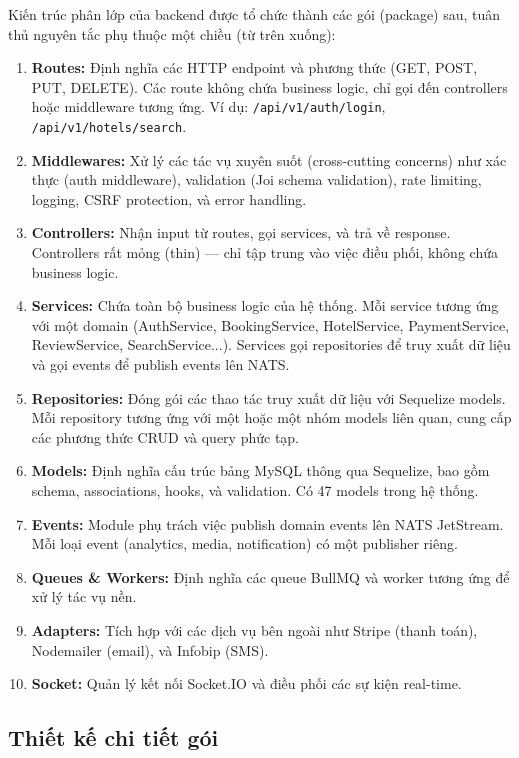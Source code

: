 \documentclass[13pt,a4paper,twoside]{report}
\begin{document}
Kiến trúc phân lớp của backend được tổ chức thành các gói (package) sau, tuân thủ nguyên tắc phụ thuộc một chiều (từ trên xuống):

\begin{enumerate}
  \item \textbf{Routes:} Định nghĩa các HTTP endpoint và phương thức (GET, POST, PUT, DELETE). Các route không chứa business logic, chỉ gọi đến controllers hoặc middleware tương ứng. Ví dụ: \texttt{/api/v1/auth/login}, \texttt{/api/v1/hotels/search}.
  \item \textbf{Middlewares:} Xử lý các tác vụ xuyên suốt (cross-cutting concerns) như xác thực (auth middleware), validation (Joi schema validation), rate limiting, logging, CSRF protection, và error handling.
  \item \textbf{Controllers:} Nhận input từ routes, gọi services, và trả về response. Controllers rất mỏng (thin) --- chỉ tập trung vào việc điều phối, không chứa business logic.
  \item \textbf{Services:} Chứa toàn bộ business logic của hệ thống. Mỗi service tương ứng với một domain (AuthService, BookingService, HotelService, PaymentService, ReviewService, SearchService...). Services gọi repositories để truy xuất dữ liệu và gọi events để publish events lên NATS.
  \item \textbf{Repositories:} Đóng gói các thao tác truy xuất dữ liệu với Sequelize models. Mỗi repository tương ứng với một hoặc một nhóm models liên quan, cung cấp các phương thức CRUD và query phức tạp.
  \item \textbf{Models:} Định nghĩa cấu trúc bảng MySQL thông qua Sequelize, bao gồm schema, associations, hooks, và validation. Có 47 models trong hệ thống.
  \item \textbf{Events:} Module phụ trách việc publish domain events lên NATS JetStream. Mỗi loại event (analytics, media, notification) có một publisher riêng.
  \item \textbf{Queues \& Workers:} Định nghĩa các queue BullMQ và worker tương ứng để xử lý tác vụ nền.
  \item \textbf{Adapters:} Tích hợp với các dịch vụ bên ngoài như Stripe (thanh toán), Nodemailer (email), và Infobip (SMS).
  \item \textbf{Socket:} Quản lý kết nối Socket.IO và điều phối các sự kiện real-time.
\end{enumerate}

\subsection{Thiết kế chi tiết gói}
\end{document}
